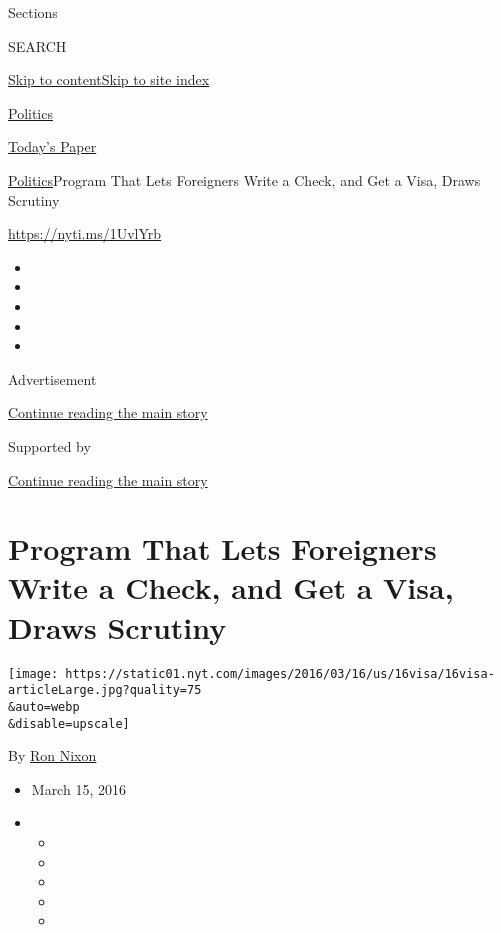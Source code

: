 Sections

SEARCH

\protect\hyperlink{site-content}{Skip to
content}\protect\hyperlink{site-index}{Skip to site index}

\href{https://www.nytimes.com/section/politics}{Politics}

\href{https://myaccount.nytimes.com/auth/login?response_type=cookie\&client_id=vi}{}

\href{https://www.nytimes.com/section/todayspaper}{Today's Paper}

\href{/section/politics}{Politics}\textbar{}Program That Lets Foreigners
Write a Check, and Get a Visa, Draws Scrutiny

\url{https://nyti.ms/1UvlYrb}

\begin{itemize}
\item
\item
\item
\item
\item
\end{itemize}

Advertisement

\protect\hyperlink{after-top}{Continue reading the main story}

Supported by

\protect\hyperlink{after-sponsor}{Continue reading the main story}

\hypertarget{program-that-lets-foreigners-write-a-check-and-get-a-visa-draws-scrutiny}{%
\section{Program That Lets Foreigners Write a Check, and Get a Visa,
Draws
Scrutiny}\label{program-that-lets-foreigners-write-a-check-and-get-a-visa-draws-scrutiny}}

\texttt{[image: https://static01.nyt.com/images/2016/03/16/us/16visa/16visa-articleLarge.jpg?quality=75\\\&auto=webp\\\&disable=upscale]}

By \href{http://www.nytimes.com/by/ron-nixon}{Ron Nixon}

\begin{itemize}
\item
  March 15, 2016
\item
  \begin{itemize}
  \item
  \item
  \item
  \item
  \item
  \end{itemize}
\end{itemize}

